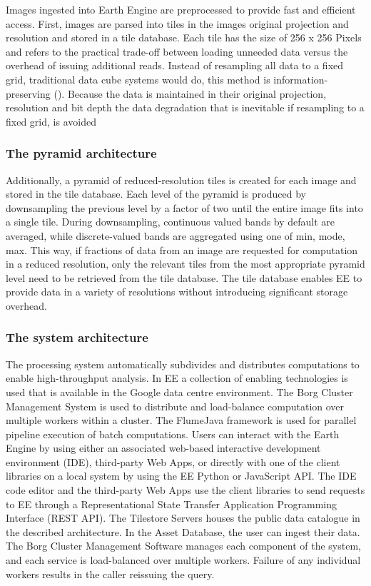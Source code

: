 Images ingested into Earth Engine are preprocessed to provide fast and efficient access. First, images are parsed into tiles in the images original projection and resolution and stored in a tile database. Each tile has the size of 256 x 256 Pixels and refers to the practical trade-off between loading unneeded data versus the overhead of issuing additional reads. Instead of resampling all data to a fixed grid, traditional data cube systems would do, this method is information-preserving (\cite{gray1997data}). Because the data is maintained in their original projection, resolution and bit depth the data degradation that is inevitable if resampling to a fixed grid, is avoided

\subsubsection{The pyramid architecture}

Additionally, a pyramid of reduced-resolution tiles is created for each image and stored in the tile database. Each level of the pyramid is produced by downsampling the previous level by a factor of two until the entire image fits into a single tile. During downsampling, continuous valued bands by default are averaged, while discrete-valued bands are aggregated using one of min, mode, max. This way, if fractions of data from an image are requested for computation in a reduced resolution, only the relevant tiles from the most appropriate pyramid level need to be retrieved from the tile database. The tile database enables EE to provide data in a variety of resolutions without introducing significant storage overhead.

\subsubsection{The system architecture}

The processing system automatically subdivides and distributes computations to enable high-throughput analysis. In EE a collection of enabling technologies is used that is available in the Google data centre environment. The Borg Cluster Management System is used to distribute and load-balance computation over multiple workers within a cluster. The FlumeJava framework is used for parallel pipeline execution of batch computations.
Users can interact with the Earth Engine by using either an associated web-based interactive development environment (IDE), third-party Web Apps, or directly with one of the client libraries on a local system by using the EE Python or JavaScript API.
The IDE code editor and the third-party Web Apps use the client libraries to send requests to EE through a Representational State Transfer Application Programming Interface (REST API). 
The Tilestore Servers houses the public data catalogue in the described architecture. In the Asset Database, the user can ingest their data. 
The Borg Cluster Management Software manages each component of the system, and each service is load-balanced over multiple workers. Failure of any individual workers results in the caller reissuing the query.


